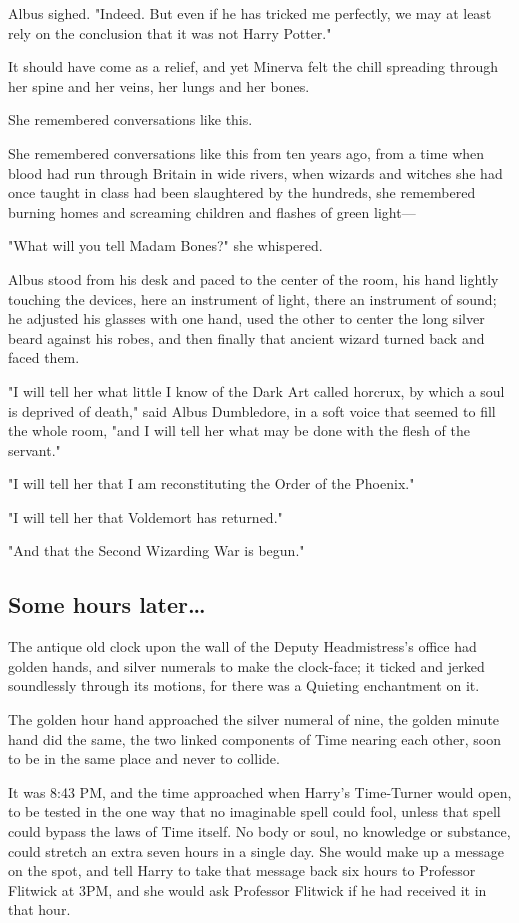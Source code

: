 Albus sighed. "Indeed. But even if he has tricked me perfectly, we may at least 
rely on the conclusion that it was not Harry Potter."

It should have come as a relief, and yet Minerva felt the chill spreading 
through her spine and her veins, her lungs and her bones.

She remembered conversations like this.

She remembered conversations like this from ten years ago, from a time when 
blood had run through Britain in wide rivers, when wizards and witches she had 
once taught in class had been slaughtered by the hundreds, she remembered 
burning homes and screaming children and flashes of green light---

"What will you tell Madam Bones?" she whispered.

Albus stood from his desk and paced to the center of the room, his hand lightly 
touching the devices, here an instrument of light, there an instrument of 
sound; he adjusted his glasses with one hand, used the other to center the long 
silver beard against his robes, and then finally that ancient wizard turned 
back and faced them.

"I will tell her what little I know of the Dark Art called horcrux, by which a 
soul is deprived of death," said Albus Dumbledore, in a soft voice that seemed 
to fill the whole room, "and I will tell her what may be done with the flesh of 
the servant."

"I will tell her that I am reconstituting the Order of the Phoenix."

"I will tell her that Voldemort has returned."

"And that the Second Wizarding War is begun."
\sbreak
\subsection{Some hours later{\ldots}}

The antique old clock upon the wall of the Deputy Headmistress's office had 
golden hands, and silver numerals to make the clock-face; it ticked and jerked 
soundlessly through its motions, for there was a Quieting enchantment on it.

The golden hour hand approached the silver numeral of nine, the golden minute 
hand did the same, the two linked components of Time nearing each other, soon 
to be in the same place and never to collide.

It was 8:43 PM, and the time approached when Harry's Time-Turner would open, to 
be tested in the one way that no imaginable spell could fool, unless that spell 
could bypass the laws of Time itself. No body or soul, no knowledge or 
substance, could stretch an extra seven hours in a single day. She would make 
up a message on the spot, and tell Harry to take that message back six hours to 
Professor Flitwick at 3PM, and she would ask Professor Flitwick if he had 
received it in that hour.

